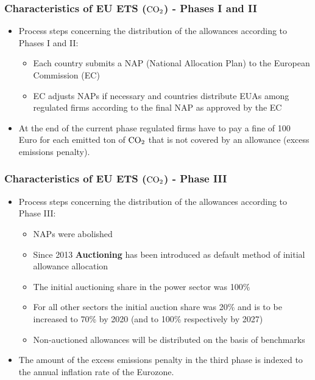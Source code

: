   \begin{frame}
  \frametitle{Characteristics of EU ETS ($\textnormal{CO}_2$) - Phases I and II}
  \begin{itemize}
  \item<1-> Process steps concerning the distribution of the allowances according to Phases I and II:
  \begin{itemize}
  \item Each country submits a NAP (National Allocation Plan) to the European Commission (EC)
  \item EC adjusts NAPs if necessary and countries distribute EUAs among regulated firms according to the final NAP as approved by the EC
  \end{itemize}
  \item<2-> At the end of the current phase regulated firms have to pay a fine of 100 Euro for each emitted ton of $\textnormal{CO}_2$ that is not covered by an allowance (excess emissions penalty).
  \end{itemize}
\end{frame}

  \begin{frame}
  \frametitle{Characteristics of EU ETS ($\textnormal{CO}_2$) - Phase III}
  \begin{itemize}
  \item<1-> Process steps concerning the distribution of the allowances according to Phase III:
  \begin{itemize}
  \item NAPs were  abolished
  \item Since 2013  \textbf{Auctioning} has been  introduced as default method of initial allowance allocation
  \item The initial auctioning share  in the power sector was 100\%
  \item For all other sectors the initial auction share was  20\% and is to be increased to 70\% by 2020 (and to 100\% respectively by 2027)
  \item Non-auctioned allowances will be distributed on the basis of benchmarks
  \end{itemize}
  \item<2-> The amount of the excess emissions penalty in the third phase is indexed to the annual inflation rate of the Eurozone.  %
  \end{itemize}
\end{frame}

